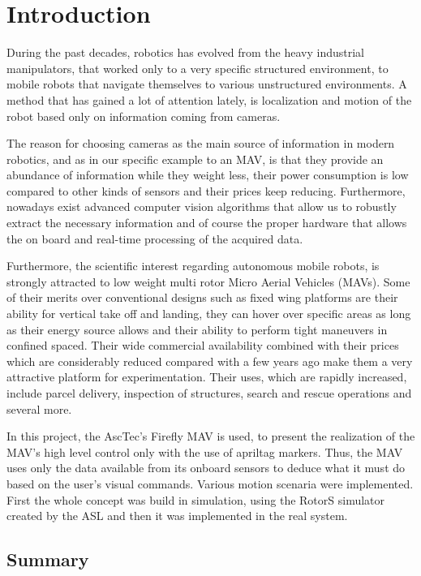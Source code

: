 \chapter{Introduction}
\label{sec:introduction}

During the past decades, robotics has evolved from the heavy industrial manipulators, that worked only to a very specific structured environment, to mobile robots that navigate themselves to various unstructured environments. A method that has gained a lot of attention lately, is localization and motion of the robot based only on information coming from cameras.

The reason for choosing cameras as the main source of information in modern robotics, and as in our specific example to an MAV, is that they provide an abundance of information while they weight less, their power consumption is low compared to other kinds of sensors and their prices keep reducing. Furthermore, nowadays exist advanced computer vision algorithms that allow us to robustly extract the necessary information and of course the proper hardware that allows the on board and real-time processing of the acquired data.  

Furthermore, the scientific interest regarding autonomous mobile robots, is strongly attracted to low weight multi rotor Micro Aerial Vehicles (MAVs). Some of their merits over conventional designs such as fixed wing platforms are their ability for vertical take off and landing, they can hover over specific areas as long as their energy source allows and their ability to perform tight maneuvers in confined spaced. Their wide commercial availability combined with their prices which are considerably reduced compared with a few years ago make them a very attractive platform for experimentation. Their uses, which are rapidly increased, include parcel delivery, inspection of structures, search and rescue operations and several more.     

In this project, the AscTec's Firefly MAV is used, to present the realization of the MAV's high level control only with the use of apriltag markers. Thus, the MAV uses only the data available from its onboard sensors to deduce what it must do based on the user's visual commands. Various motion scenaria were implemented. First the whole concept was build in simulation, using the RotorS simulator created by the ASL \cite{RotorsSimulator} and then it was implemented in the real system.  

\section{Summary}
\label{sec:summary}
 
